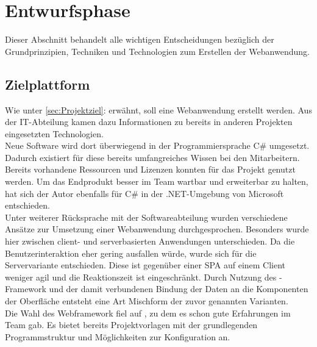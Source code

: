 \section{Entwurfsphase} 
\label{sec:Entwurfsphase}
Dieser Abschnitt behandelt alle wichtigen Entscheidungen bezüglich der Grundprinzipien, Techniken und Technologien zum
Erstellen der Webanwendung.

\subsection{Zielplattform}
\label{sec:Zielplattform}
Wie unter \ref{sec:Projektziel}:  erwähnt, 
soll eine Webanwendung erstellt werden. Aus der IT-Abteilung kamen dazu Informationen zu bereits 
in anderen Projekten eingesetzten Technologien.\\
Neue Software wird dort überwiegend in der Programmiersprache C\# umgesetzt. 
Dadurch existiert für diese bereits umfangreiches Wissen bei den Mitarbeitern.
Bereits vorhandene Ressourcen und Lizenzen konnten für das Projekt genutzt werden.
Um das Endprodukt besser im Team wartbar und erweiterbar zu halten, hat sich der Autor 
ebenfalls für C\# in der .NET-Umgebung von Microsoft entschieden.\\
Unter weiterer Rücksprache mit der Softwareabteilung wurden verschiedene Ansätze zur
Umsetzung einer Webanwendung durchgesprochen. Besonders wurde hier zwischen client- und serverbasierten
Anwendungen unterschieden. Da die Benutzerinteraktion eher gering ausfallen würde, wurde sich
für die Servervariante entschieden. Diese ist gegenüber einer \ac{SPA} auf einem Client weniger agil und die 
Reaktionszeit ist eingeschränkt. Durch Nutzung des -Framework und der damit
verbundenen Bindung der Daten an die Komponenten der Oberfläche entsteht eine Art Mischform der zuvor genannten Varianten.\\
Die Wahl des Webframework fiel auf , zu dem es schon gute Erfahrungen im Team gab.
Es bietet bereits Projektvorlagen mit der grundlegenden Programmstruktur und Möglichkeiten zur
Konfiguration an. 

